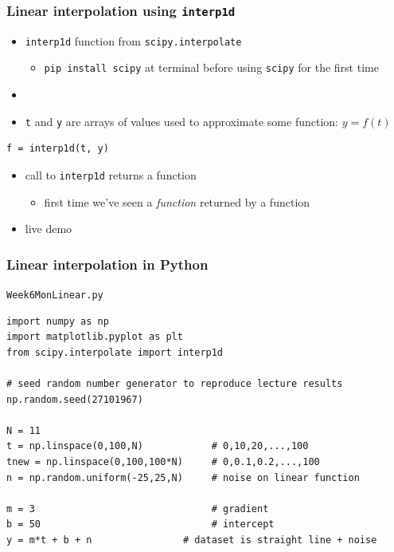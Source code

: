 \documentclass[english,14pt]{beamer}
\begin{document}

\begin{frame}[fragile]

\frametitle{Linear interpolation using \texttt{interp1d}}

\begin{itemize}
	\item \texttt{interp1d} function from \texttt{scipy.interpolate}
	\begin{itemize}
		\item \texttt{pip install scipy} at terminal before using \texttt{scipy} for the first time
	\end{itemize}
	\item[]
	\item \texttt{t} and \texttt{y} are arrays of values used to approximate some function: $y = f(t)$
\end{itemize}

\begin{lstlisting}[style=CStyle,basicstyle=\large]
f = interp1d(t, y)
\end{lstlisting}	
\begin{itemize}
	\item call to \texttt{interp1d} returns a function
	\begin{itemize}
		\item first time we've seen a \emph{function} returned by a function
	\end{itemize}
	\item live demo
\end{itemize}

\end{frame}


\begin{frame}[fragile]

\frametitle{Linear interpolation in Python}

\texttt{Week6MonLinear.py}

\begin{lstlisting}[style=CStyle,basicstyle=\scriptsize]
import numpy as np
import matplotlib.pyplot as plt
from scipy.interpolate import interp1d

# seed random number generator to reproduce lecture results
np.random.seed(27101967)

N = 11
t = np.linspace(0,100,N)            # 0,10,20,...,100
tnew = np.linspace(0,100,100*N)     # 0,0.1,0.2,...,100
n = np.random.uniform(-25,25,N)     # noise on linear function

m = 3                               # gradient
b = 50                              # intercept
y = m*t + b + n                # dataset is straight line + noise
\end{lstlisting}
\end{frame}
\end{document}
